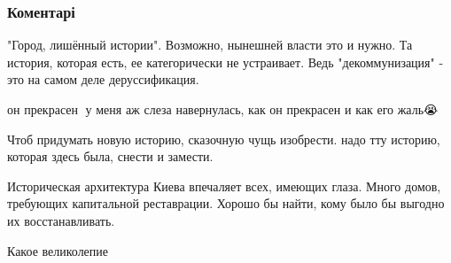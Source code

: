  
 
 
 
 
\subsubsection{Коментарі}

\begin{itemize}
 
"Город, лишённый истории". Возможно, нынешней власти это и нужно. Та история,
которая есть, ее категорически не устраивает. Ведь "декоммунизация" - это на
самом деле деруссификация.

 
он прекрасен🖤
у меня аж слеза навернулась, как он прекрасен и как его жаль😭🖤

 
Чтоб придумать новую историю, сказочную чущь изобрести. надо тту историю, которая здесь была, снести и замести.

 
Историческая архитектура Киева впечаляет всех, имеющих глаза. Много домов, требующих капитальной реставрации. Хорошо бы найти, кому было бы выгодно их восстанавливать.

 
Какое великолепие
\end{itemize}

